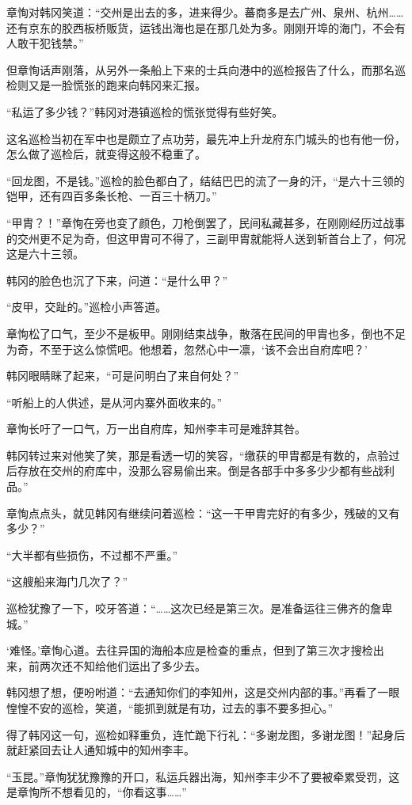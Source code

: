 章恂对韩冈笑道：“交州是出去的多，进来得少。蕃商多是去广州、泉州、杭州……还有京东的胶西板桥贩货，运钱出海也是在那几处为多。刚刚开埠的海门，不会有人敢干犯钱禁。”

但章恂话声刚落，从另外一条船上下来的士兵向港中的巡检报告了什么，而那名巡检则又是一脸慌张的跑来向韩冈来汇报。

“私运了多少钱？”韩冈对港镇巡检的慌张觉得有些好笑。

这名巡检当初在军中也是颇立了点功劳，最先冲上升龙府东门城头的也有他一份，怎么做了巡检后，就变得这般不稳重了。

“回龙图，不是钱。”巡检的脸色都白了，结结巴巴的流了一身的汗，“是六十三领的铠甲，还有四百多条长枪、一百三十柄刀。”

“甲胄？！”章恂在旁也变了颜色，刀枪倒罢了，民间私藏甚多，在刚刚经历过战事的交州更不足为奇，但这甲胄可不得了，三副甲胄就能将人送到斩首台上了，何况这是六十三领。

韩冈的脸色也沉了下来，问道：“是什么甲？”

“皮甲，交趾的。”巡检小声答道。

章恂松了口气，至少不是板甲。刚刚结束战争，散落在民间的甲胄也多，倒也不足为奇，不至于这么惊慌吧。他想着，忽然心中一凛，‘该不会出自府库吧？’

韩冈眼睛眯了起来，“可是问明白了来自何处？”

“听船上的人供述，是从河内寨外面收来的。”

章恂长吁了一口气，万一出自府库，知州李丰可是难辞其咎。

韩冈转过来对他笑了笑，那是看透一切的笑容，“缴获的甲胄都是有数的，点验过后存放在交州的府库中，没那么容易偷出来。倒是各部手中多多少少都有些战利品。”

章恂点点头，就见韩冈有继续问着巡检：“这一干甲胄完好的有多少，残破的又有多少？”

“大半都有些损伤，不过都不严重。”

“这艘船来海门几次了？”

巡检犹豫了一下，咬牙答道：“……这次已经是第三次。是准备运往三佛齐的詹卑城。”

‘难怪。’章恂心道。去往异国的海船本应是检查的重点，但到了第三次才搜检出来，前两次还不知给他们运出了多少去。

韩冈想了想，便吩咐道：“去通知你们的李知州，这是交州内部的事。”再看了一眼惶惶不安的巡检，笑道，“能抓到就是有功，过去的事不要多担心。”

得了韩冈这一句，巡检如释重负，连忙跪下行礼：“多谢龙图，多谢龙图！”起身后就赶紧回去让人通知城中的知州李丰。

“玉昆。”章恂犹犹豫豫的开口，私运兵器出海，知州李丰少不了要被牵累受罚，这是章恂所不想看见的，“你看这事……”

